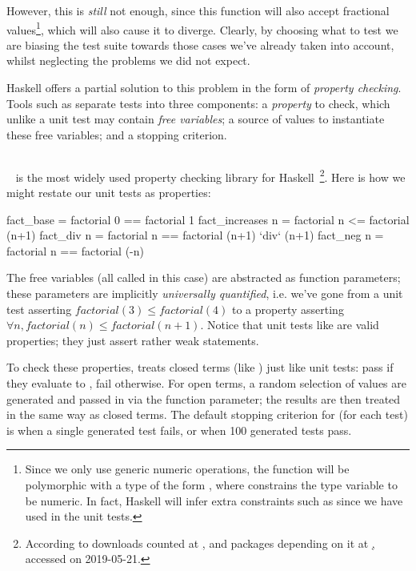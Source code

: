 However, this is \emph{still} not enough, since this function will also accept
fractional values\footnote{Since we only use generic numeric operations, the
  function will be polymorphic with a type of the form , where  constrains the type variable  to be
  numeric. In fact, Haskell will infer extra constraints such as  since
  we have used \hs{==} in the unit tests.}, which will also cause it to
diverge. Clearly, by choosing what to test we are biasing the test suite towards
those cases we've already taken into account, whilst neglecting the problems we
did not expect.

Haskell offers a partial solution to this problem in the form of \emph{property
  checking}. Tools such as \qcheck{} separate tests into three components: a
\emph{property} to check, which unlike a unit test may contain \emph{free
  variables}; a source of values to instantiate these free variables; and a
stopping criterion.

\subsection{\qcheck{}}
\label{sec:quickcheck}

\qcheck{}~\cite{quickcheck} is the most widely used property checking library
for
Haskell~\footnote{According to downloads counted at
  \href{http://hackage.haskell.org/packages/browse}, and packages depending on
  it at \href{https://packdeps.haskellers.com/reverse/QuickCheck}, accessed on
  2019-05-21.}. Here is how we might restate our unit tests as \qcheck{}
properties:

\begin{haskell}
fact_base        = factorial 0 == factorial 1
fact_increases n = factorial n <= factorial (n+1)
fact_div       n = factorial n == factorial (n+1) `div` (n+1)
fact_neg       n = factorial n == factorial (-n)
\end{haskell}

The free variables (all called  in this case) are abstracted as function
parameters; these parameters are implicitly \emph{universally quantified},
i.e. we've gone from a unit test asserting $factorial(3) \leq factorial(4)$ to a
property asserting $\forall n, factorial(n) \leq factorial(n+1)$. Notice that
unit tests like  are valid properties; they just assert rather
weak statements.

To check these properties, \qcheck{} treats closed terms (like )
just like unit tests: pass if they evaluate to , fail otherwise. For
open terms, a random selection of values are generated and passed in via the
function parameter; the results are then treated in the same way as closed
terms. The default stopping criterion for \qcheck{} (for each test) is when a
single generated test fails, or when 100 generated tests pass.

